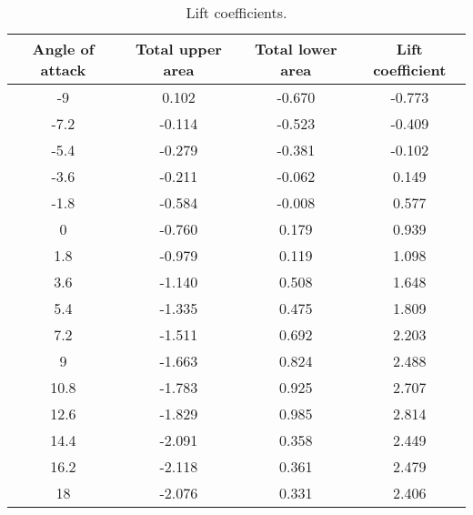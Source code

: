 \begin{table}[H]
    \centering
    \label{q2bvals2}
    \begin{tabular}{||c|c|c|c||}
        \hline
        \textbf{Angle of attack} & \textbf{Total upper area} & \textbf{Total lower area} & \textbf{Lift coefficient} \\
        \hline
        \hline
        -9                       & 0.102                     & -0.670                    & -0.773                    \\
        -7.2                     & -0.114                    & -0.523                    & -0.409                    \\
        -5.4                     & -0.279                    & -0.381                    & -0.102                    \\
        -3.6                     & -0.211                    & -0.062                    & 0.149                     \\
        -1.8                     & -0.584                    & -0.008                    & 0.577                     \\
        0                        & -0.760                    & 0.179                     & 0.939                     \\
        1.8                      & -0.979                    & 0.119                     & 1.098                     \\
        3.6                      & -1.140                    & 0.508                     & 1.648                     \\
        5.4                      & -1.335                    & 0.475                     & 1.809                     \\
        7.2                      & -1.511                    & 0.692                     & 2.203                     \\
        9                        & -1.663                    & 0.824                     & 2.488                     \\
        10.8                     & -1.783                    & 0.925                     & 2.707                     \\
        12.6                     & -1.829                    & 0.985                     & 2.814                     \\
        14.4                     & -2.091                    & 0.358                     & 2.449                     \\
        16.2                     & -2.118                    & 0.361                     & 2.479                     \\
        18                       & -2.076                    & 0.331                     & 2.406                     \\
        \hline
    \end{tabular}
    \caption{Lift coefficients.}
\end{table}
